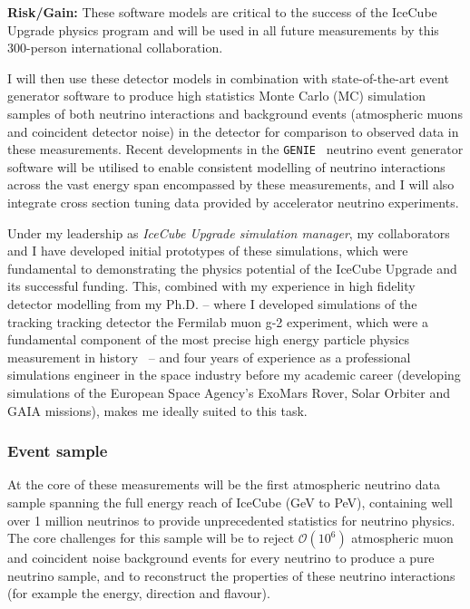 \documentclass[a4paper,11pt]{article}
\begin{document}
\textbf{Risk/Gain:} These software models are critical to the success of the IceCube Upgrade physics program and will be used in all future measurements by this 300-person international collaboration.

I will then use these detector models in combination with state-of-the-art event generator software to produce high statistics Monte Carlo (MC) simulation samples of both neutrino interactions and background events (atmospheric muons and coincident detector noise) in the detector for comparison to observed data in these measurements. Recent developments in the \texttt{GENIE}~\cite{Andreopoulos:2009zz, Garcia:2019hze} neutrino event generator software will be utilised to enable consistent modelling of neutrino interactions across the vast energy span encompassed by these measurements, and I will also integrate cross section tuning data provided by accelerator neutrino experiments. 

Under my leadership as \textit{IceCube Upgrade simulation manager}, my collaborators and I have developed initial prototypes of these simulations, which were fundamental to demonstrating the physics potential of the IceCube Upgrade and its successful funding. This, combined with my experience in high fidelity detector modelling from my Ph.D. -- where I developed simulations of the tracking tracking detector the Fermilab muon g-2 experiment, which were a fundamental component of the most precise high energy particle physics measurement in history~\cite{gm2_run1_result} -- and four years of experience as a professional simulations engineer in the space industry before my academic career (developing simulations of the European Space Agency's ExoMars Rover, Solar Orbiter and GAIA missions), makes me ideally suited to this task. \\

\subsubsection{Event sample}

At the core of these measurements will be the first atmospheric neutrino data sample spanning the full energy reach of IceCube (GeV to PeV), containing well over 1 million neutrinos to provide unprecedented statistics for neutrino physics. The core challenges for this sample will be to reject $\mathcal{O}(10^6)$ atmospheric muon and coincident noise background events for every neutrino to produce a pure neutrino sample, and to reconstruct the properties of these neutrino interactions (for example the energy, direction and flavour). 
\end{document}
